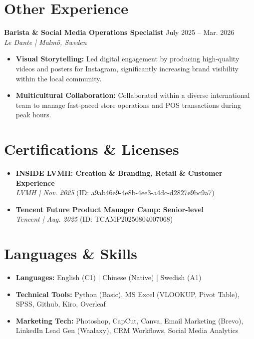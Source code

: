 \documentclass[a4paper,10pt]{article}
\begin{document}
\section*{Other Experience}

\textbf{Barista \& Social Media Operations Specialist} \hfill July 2025 -- Mar. 2026\\
\textit{Le Dante | Malm\"{o}, Sweden}
\begin{itemize}[noitemsep]
  \item \textbf{Visual Storytelling:} Led digital engagement by producing high-quality videos and posters for Instagram, significantly increasing brand visibility within the local community.
  \item \textbf{Multicultural Collaboration:} Collaborated within a diverse international team to manage fast-paced store operations and POS transactions during peak hours.
\end{itemize}

\section*{Certifications \& Licenses}
\begin{itemize}[noitemsep]
  \item \textbf{INSIDE LVMH: Creation \& Branding, Retail \& Customer Experience}\\
  \textit{LVMH | Nov. 2025} \quad (ID: a9ab46e9-4e8b-4ee3-a4dc-d2827e9bc9a7)
  \item \textbf{Tencent Future Product Manager Camp: Senior-level}\\
  \textit{Tencent | Aug. 2025} \quad (ID: TCAMP20250804007068)
\end{itemize}

\section*{Languages \& Skills}
\begin{itemize}[noitemsep]
  \item \textbf{Languages:} English (C1) | Chinese (Native) | Swedish (A1)
  \item \textbf{Technical Tools:} Python (Basic), MS Excel (VLOOKUP, Pivot Table), SPSS, Github, Kiro, Overleaf
  \item \textbf{Marketing Tech:} Photoshop, CapCut, Canva, Email Marketing (Brevo), LinkedIn Lead Gen (Waalaxy), CRM Workflows, Social Media Analytics
\end{itemize}
\end{document}

